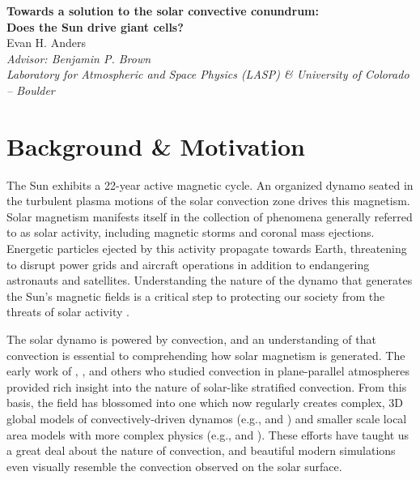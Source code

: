 \documentclass[aasms,12pt]{article}
\begin{document}
\begin{center}
   \large\textbf{Towards a solution to the solar convective conundrum:}\\
   \large\textbf{Does the Sun drive giant cells?}\\
   \vspace{0.2cm}
   \large{Evan H. Anders}\\
   \vspace{0.2cm}
   \normalsize\textit{Advisor: Benjamin P. Brown}\\
   \normalsize\textit{Laboratory for Atmospheric and Space Physics (LASP) \& University of Colorado -- Boulder}\\
\end{center}

\vspace{-0.6cm}
\section{Background \& Motivation}
The Sun exhibits a 22-year active magnetic cycle.
An organized dynamo seated in the turbulent plasma
motions of the solar convection zone drives this magnetism.
Solar magnetism manifests itself in the collection of phenomena generally
referred to as solar activity, including magnetic storms and coronal mass
ejections.  Energetic particles ejected by this activity propagate towards Earth, 
threatening to disrupt power grids and aircraft operations in addition to endangering astronauts and satellites.
Understanding the nature of the dynamo that generates the Sun's magnetic fields is a critical
step to protecting our society from the threats of solar activity \citep{charbonneau2014}.

The solar dynamo is powered by convection, and
an understanding of that convection is essential to comprehending
how solar magnetism is generated. The early work of \cite{graham1975}, \cite{hurlburt&all1984},
and others who studied convection in plane-parallel atmospheres
provided rich insight into the nature of solar-like stratified convection.  From this basis,
the field has blossomed into one which now regularly creates complex, 3D global models of convectively-driven
dynamos (e.g., \cite{brown&all2010} and \cite{guerrero&all2016})
and smaller scale local area models with more complex physics 
(e.g., \cite{stein&nordlund2012} and \cite{rempel2014}).
These efforts have taught us a great deal about the nature of convection, and
beautiful modern simulations even visually resemble the convection observed on the solar surface.
\end{document}
